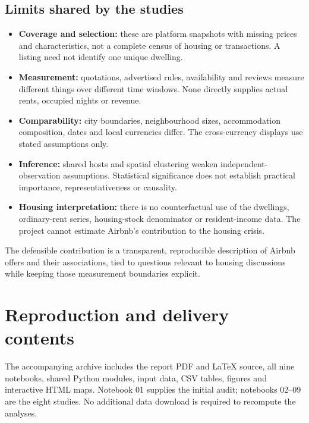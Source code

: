 \documentclass[11pt,a4paper]{article}
\begin{document}
\subsection{Limits shared by the studies}
\begin{itemize}
\item \textbf{Coverage and selection:} these are platform snapshots with missing prices and characteristics, not a complete census of housing or transactions. A listing need not identify one unique dwelling.
\item \textbf{Measurement:} quotations, advertised rules, availability and reviews measure different things over different time windows. None directly supplies actual rents, occupied nights or revenue.
\item \textbf{Comparability:} city boundaries, neighbourhood sizes, accommodation composition, dates and local currencies differ. The cross-currency displays use stated assumptions only.
\item \textbf{Inference:} shared hosts and spatial clustering weaken independent-observation assumptions. Statistical significance does not establish practical importance, representativeness or causality.
\item \textbf{Housing interpretation:} there is no counterfactual use of the dwellings, ordinary-rent series, housing-stock denominator or resident-income data. The project cannot estimate Airbnb's contribution to the housing crisis.
\end{itemize}

The defensible contribution is a transparent, reproducible description of Airbnb offers and their associations, tied to questions relevant to housing discussions while keeping those measurement boundaries explicit.

\clearpage
\section{Reproduction and delivery contents}
The accompanying archive includes the report PDF and LaTeX source, all nine notebooks, shared Python modules, input data, CSV tables, figures and interactive HTML maps. Notebook 01 supplies the initial audit; notebooks 02--09 are the eight studies. No additional data download is required to recompute the analyses.
\end{document}
